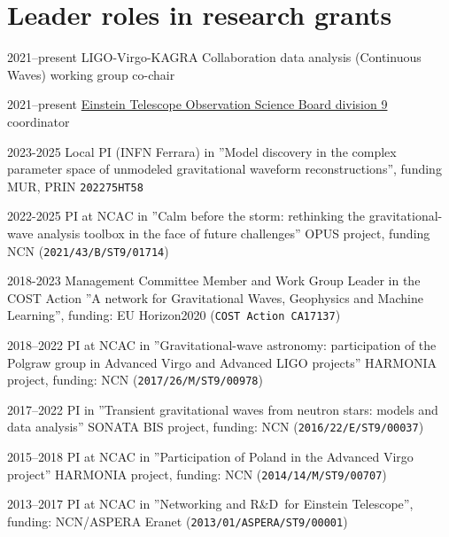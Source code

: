 \documentclass[]{friggeri-cv} %
\begin{document}
\section{Leader roles in research grants} 
\begin{entrylistoc}

\entrys 
{2021--present} 
{LIGO-Virgo-KAGRA Collaboration data analysis (Continuous Waves) working group co-chair} 

\entrys
{2021--present} 
{\href{https://indico.ego-gw.it/event/240/timetable/\#20210922}{Einstein Telescope Observation Science Board division 9} coordinator}

\entrys
{2023-2025} 
{Local PI (INFN Ferrara) in ''Model discovery in the complex parameter space of unmodeled gravitational waveform reconstructions'', funding MUR, PRIN {\tt 202275HT58}}  

\entrys
{2022-2025} 
{PI at NCAC in ''Calm before the storm: rethinking the gravitational-wave analysis toolbox in the face of future challenges'' OPUS project, funding NCN ({\tt 2021/43/B/ST9/01714})}

\entrys 
{2018-2023} 
{Management Committee Member and Work Group Leader in the COST Action ''A network for Gravitational Waves, Geophysics and Machine Learning'', funding: EU Horizon2020 ({\tt COST Action CA17137}) } 
   
\entrys
{2018--2022}
{PI at NCAC in ''Gravitational-wave astronomy: participation of the Polgraw group in Advanced Virgo and Advanced LIGO projects'' HARMONIA project, funding: NCN ({\tt 2017/26/M/ST9/00978})}

\entrys
{2017--2022} 
{PI in ''Transient gravitational waves from neutron stars: models and data analysis'' SONATA BIS project, funding: NCN ({\tt 2016/22/E/ST9/00037})} 

\entrys
{2015--2018} 
{PI at NCAC in ''Participation of Poland in the Advanced Virgo project'' HARMONIA project, funding: NCN ({\tt 2014/14/M/ST9/00707})} 

\entrys
{2013--2017}
{PI at NCAC in ''Networking and R\&D for Einstein Telescope'', funding: NCN/ASPERA Eranet ({\tt 2013/01/ASPERA/ST9/00001})}


\end{entrylistoc}

\pagebreak 
{} %
\end{document}
